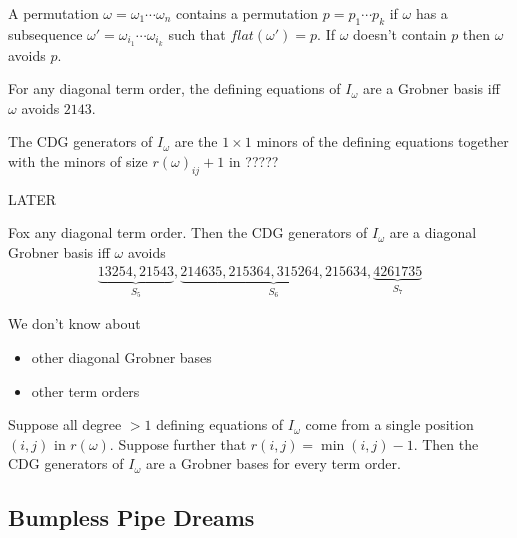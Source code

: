 \begin{definition}
    A permutation $\omega = \omega_1 \cdots \omega_n$ contains a permutation $p = p_1 \cdots p_k$ if $\omega$ has a subsequence $\omega ' = \omega_{i_1} \cdots \omega_{i_k}$ such that $flat(\omega ') = p$. If $\omega $ doesn't contain $p$ then $\omega $ avoids $p$.
\end{definition}

\begin{theorem}
    For any diagonal term order, the defining equations of $I_\omega$ are a Grobner basis iff $\omega$ avoids $2143$.
\end{theorem}

\begin{definition}
    The CDG generators of $I_\omega$ are the $1 \times 1$ minors of the defining equations together with the minors of size $r(\omega)_{ij} + 1$ in ?????
\end{definition}

\begin{example}
    LATER
\end{example}

\begin{theorem}
    Fox any diagonal term order. Then the CDG generators of $I_\omega$ are a diagonal Grobner basis iff $\omega $ avoids
    \begin{align*}
        \underbrace{13254, 21543}_{S_5} , \underbrace{214635 , 215364, 315264, 215634 }_{S_6} , \underbrace{4261735}_{S_7}
    \end{align*}
\end{theorem}

\begin{remark}
    We don't know about
    \begin{itemize}
        \item other diagonal Grobner bases
        \item other term orders
    \end{itemize}
\end{remark}

\begin{proposition}
    Suppose all degree $>1$ defining equations of $I_\omega$ come from a single position $(i,j)$ in $r(\omega)$. Suppose further that $r(i,j) = \min (i,j) - 1$. Then the CDG generators of $I_\omega$ are a Grobner bases for every term order.
\end{proposition}

\subsection{Bumpless Pipe Dreams}

